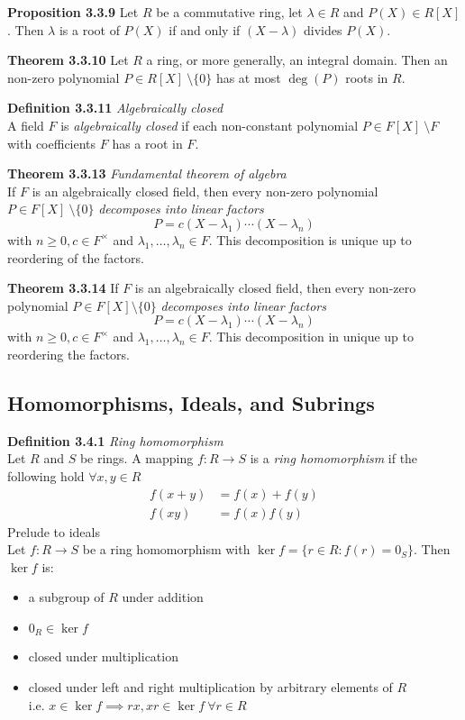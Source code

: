 \documentclass[8pt,landscape]{article}
\begin{document}
\begin{multicols}{3}
    \textbf{Proposition 3.3.9}
    Let $R$ be a commutative ring, let $\lambda \in R$ and $P(X) \in R[X]$.
    Then $\lambda$ is a root of $P(X)$ if and only if $(X-\lambda)$ divides $P(X)$.

    \textbf{Theorem 3.3.10}
    Let $R$ a ring, or more generally, an integral domain.
    Then an non-zero polynomial $P \in R[X] \ \setminus \{0\}$ has at most $\deg(P)$
    roots in $R$.

    \textbf{Definition 3.3.11} \emph{Algebraically closed} \\
    A field $F$ is \emph{algebraically closed} if each non-constant polynomial
    $P \in F[X] \ \setminus F$ with coefficients $F$ has a root in $F$.

    \textbf{Theorem 3.3.13} \emph{Fundamental theorem of algebra} \\
    If $F$ is an algebraically closed field, then every non-zero polynomial
    $P \in F[X] \ \setminus \{0\}$ \emph{decomposes into linear factors}
    \[
        P = c(X - \lambda_1) \cdots (X - \lambda_n)
    \]
    with $n \geq 0, c \in F^\times$ and $\lambda_1, \ldots, \lambda_n \in F$.
    This decomposition is unique up to reordering of the factors.

    \textbf{Theorem 3.3.14}
    If $F$ is an algebraically closed field, then every non-zero polynomial
    $P \in F[X] \setminus \{0\}$ \emph{decomposes into linear factors}
    \[
        P = c(X - \lambda_1) \cdots (X - \lambda_n)
    \]
    with $n \geq 0, c \in F^\times$ and $\lambda_1, \ldots, \lambda_n \in F$.
    This decomposition in unique up to reordering the factors.

    \subsection{Homomorphisms, Ideals, and Subrings}

    \textbf{Definition 3.4.1} \emph{Ring homomorphism} \\
    Let $R$ and $S$ be rings.
    A mapping $f : R \to S$ is a \emph{ring homomorphism} if the following hold
    $\forall x,y\in R$
    \begin{align*}{}
        f(x+y) & = f(x) + f(y) \\
        f(xy)  & = f(x)f(y)
    \end{align*}
    Prelude to ideals \\
    Let $f : R \to S$ be a ring homomorphism with $\ker f = \{ r \in R : f(r) = 0_S \}$.
    Then $\ker f$ is:
    \begin{itemize}
        \item a subgroup of $R$ under addition
        \item $0_R \in \ker f$
        \item closed under multiplication
        \item closed under left and right multiplication by arbitrary elements of $R$ \\
            i.e. $x \in \ker f \implies rx, xr \in \ker f \ \forall r \in R$
    \end{itemize}


\end{multicols}
\end{document}
